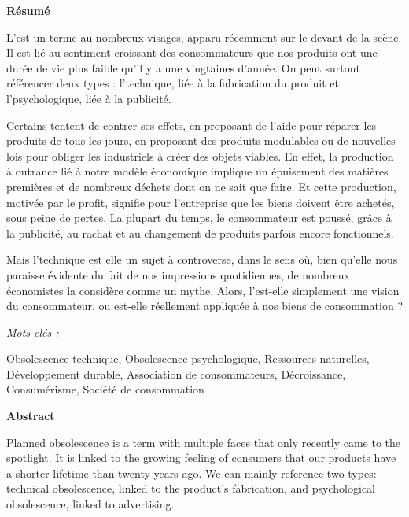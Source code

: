 
\begin{Large}
\textbf{Résumé}
\end{Large}

\vspace{1\baselineskip}

L'\op est un terme au nombreux visages, apparu récemment sur le devant de la scène. Il est lié au sentiment croissant des consommateurs que nos produits ont une durée de vie plus faible qu'il y a une vingtaines d'année. 
On peut surtout référencer deux types : l'\op technique, liée à la fabrication du produit et l'\op psychologique, liée à la publicité.

Certains tentent de contrer ses effets, en proposant de l'aide pour réparer les produits de tous les jours, en proposant des produits modulables ou de nouvelles lois pour obliger les industriels à créer des objets viables. 
En effet, la production à outrance lié à notre modèle économique implique un épuisement des matières premières et de nombreux déchets dont on ne sait que faire. Et cette production, motivée par le profit, signifie pour l'entreprise que les biens doivent être achetés, sous peine de pertes. La plupart du temps, le consommateur est poussé, grâce à la publicité, au rachat et au changement de produits parfois encore fonctionnels. 

Mais l'\op technique est elle un sujet à controverse, dans le sens où, bien qu'elle nous paraisse évidente du fait de nos impressions quotidiennes, de nombreux économistes la considère comme un mythe. Alors, l'\op est-elle simplement une vision du consommateur, ou est-elle réellement appliquée à nos biens de consommation ?

\vspace{2\baselineskip}

\begin{large} \emph{Mots-clés :} \end{large}Obsolescence technique, Obsolescence psychologique, Ressources naturelles, Développement durable, Association de consommateurs, Décroissance, Consumérisme, Société de consommation


\vspace{4\baselineskip}



\begin{Large}
\textbf{Abstract}
\end{Large}

Planned obsolescence is a term with multiple faces that only recently came to the spotlight. It is linked to the growing feeling of consumers that our products have a shorter lifetime than twenty years ago. We can mainly reference two types: technical obsolescence, linked to the product’s fabrication, and psychological obsolescence, linked to advertising.

